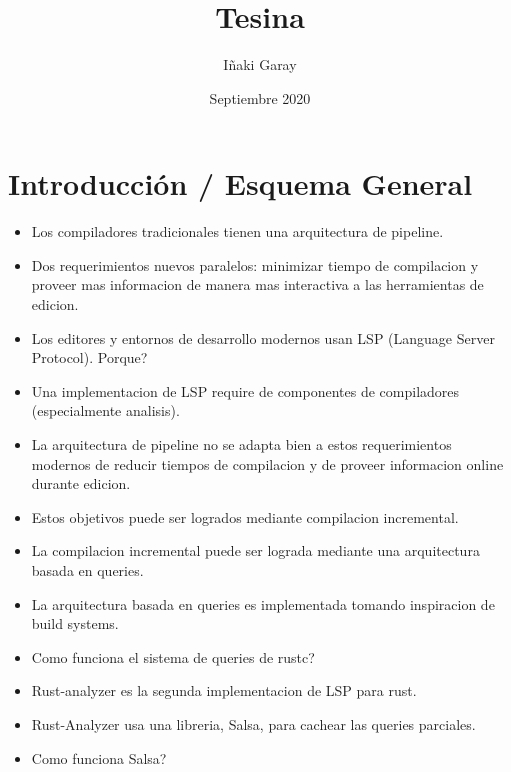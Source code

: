 \documentclass[12pt, a4paper]{report}
\title{Tesina}
\author{Iñaki Garay}
\date{Septiembre 2020}
\begin{document}
\begin{titlepage}
\maketitle
\thispagestyle{empty}
\end{titlepage}

\tableofcontents
\thispagestyle{empty}

\newpage

\chapter*{Introducción / Esquema General}

  \begin{itemize}[noitemsep]

    \item Los compiladores tradicionales tienen una arquitectura de pipeline.

    \item Dos requerimientos nuevos paralelos: minimizar tiempo de compilacion y proveer mas informacion de manera mas interactiva a las herramientas de edicion.

    \item Los editores y entornos de desarrollo modernos usan LSP (Language Server Protocol). Porque?

    \item Una implementacion de LSP require de componentes de compiladores (especialmente analisis).

    \item La arquitectura de pipeline no se adapta bien a estos requerimientos modernos de reducir tiempos de compilacion y de proveer informacion online durante edicion.

    \item Estos objetivos puede ser logrados mediante compilacion incremental.

    \item La compilacion incremental puede ser lograda mediante una arquitectura basada en queries.

    \item La arquitectura basada en queries es implementada tomando inspiracion de build systems.

    \item Como funciona el sistema de queries de rustc?

    \item Rust-analyzer es la segunda implementacion de LSP para rust.

    \item Rust-Analyzer usa una libreria, Salsa, para cachear las queries parciales.

    \item Como funciona Salsa?

  \end{itemize}
\end{document}
